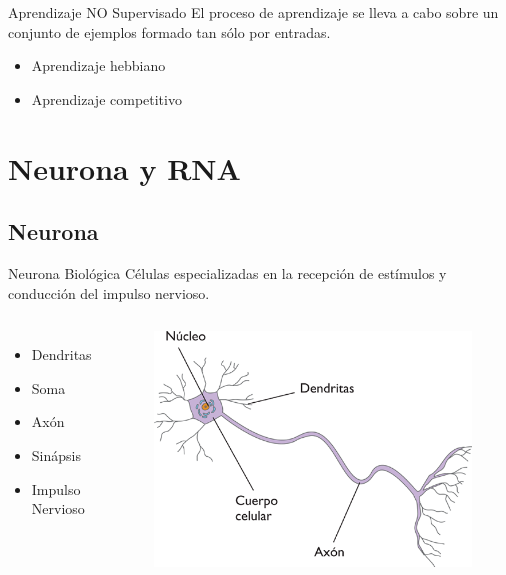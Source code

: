 \documentclass{beamer}
\begin{document}
\begin{frame}
\begin{block}{Aprendizaje NO Supervisado}
El proceso de aprendizaje se lleva a cabo sobre un conjunto de ejemplos formado tan sólo por entradas.\pause
\begin{itemize}
\item {Aprendizaje hebbiano\pause}
\item {Aprendizaje competitivo}
\end{itemize}
\end{block}
\end{frame}

\section{Neurona y RNA}
\subsection{Neurona}
\begin{frame}{Neurona Biológica}
Células especializadas en la recepción de estímulos y conducción del impulso
nervioso.\pause
\begin{columns}
\begin{itemize}
\item {Dendritas\pause}
\item {Soma\pause}
\item {Axón\pause}
\item {Sinápsis\pause}
\item {Impulso Nervioso\pause}
\end{itemize}
\begin{figure}
\includegraphics[scale=0.23]{neurona.png}
\centering
\end{figure}
\end{columns}
\end{frame}
\end{document}
